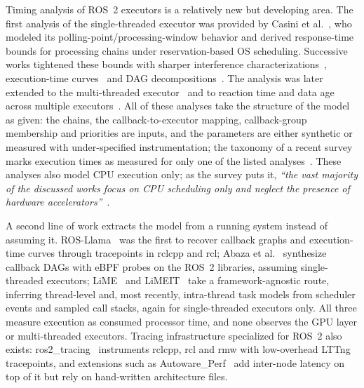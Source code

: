 Timing analysis of ROS~2 executors is a relatively new but developing area. The first analysis of the single-threaded executor was provided by Casini et al.~\cite{casini-19-reservationbased}, who modeled its polling-point/processing-window behavior and derived response-time bounds for processing chains under reservation-based OS scheduling. Successive works tightened these bounds with sharper interference characterizations~\cite{tang-2020-rtanalysispriorityassignmentchains}, execution-time curves~\cite{blass-2021-starvation} and DAG decompositions~\cite{tang-2023-rtaexecutor}. The analysis was later extended to the multi-threaded executor~\cite{jiang-22-processingchains,sobhani-2023-mtexecutoranalysis} and to reaction time and data age across multiple executors~\cite{teper-2024-end2endmtexecutoranalysisoptimization}. All of these analyses take the structure of the model as given: the chains, the callback-to-executor mapping, callback-group membership and priorities are inputs, and the parameters are either synthetic or measured with under-specified instrumentation; the taxonomy of a recent survey marks execution times as measured for only one of the listed analyses~\cite{casini-2025-surveyros2}. These analyses also model CPU execution only; as the survey puts it, \textit{``the vast majority of the discussed works focus on CPU scheduling only and neglect the presence of hardware accelerators''}~\cite{casini-2025-surveyros2}.

A second line of work extracts the model from a running system instead of assuming it. ROS-Llama~\cite{blass-2021-rosllama-paper} was the first to recover callback graphs and execution-time curves through tracepoints in rclcpp and rcl; Abaza et al.~\cite{abaza-2024-ros2modelsynthesis} synthesize callback DAGs with eBPF probes on the ROS~2 libraries, assuming single-threaded executors; LiME~\cite{brandenburg-25-lime} and LiMEIT~\cite{brandenburg-2026-limeit} take a framework-agnostic route, inferring thread-level and, most recently, intra-thread task models from scheduler events and sampled call stacks, again for single-threaded executors only. All three measure execution as consumed processor time, and none observes the GPU layer or multi-threaded executors. Tracing infrastructure specialized for ROS~2 also exists: ros2\_tracing~\cite{bedard-2022-ros2tracing} instruments rclcpp, rcl and rmw with low-overhead LTTng tracepoints, and extensions such as Autoware\_Perf~\cite{li-2022-autowareperf} add inter-node latency on top of it but rely on hand-written architecture files.

